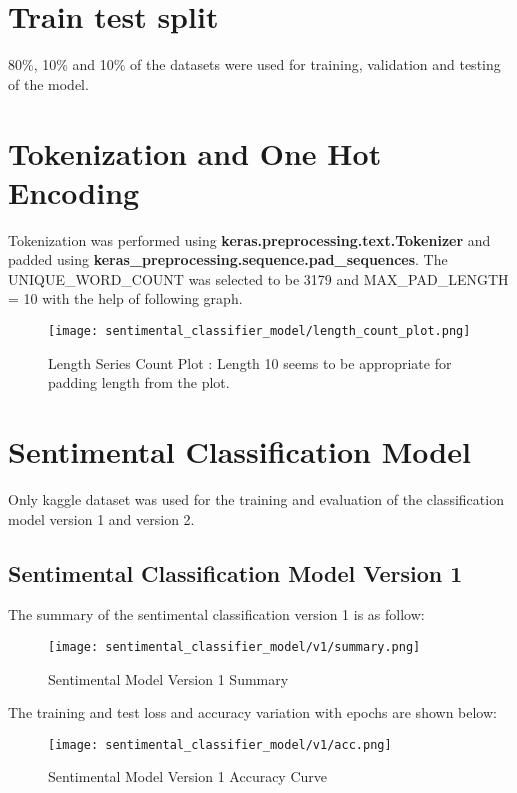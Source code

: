 \section{Train test split}
80\%, 10\% and 10\% of the datasets were used for training, validation and testing of the model.

\section{Tokenization and One Hot Encoding}
Tokenization was performed using \textbf{keras.preprocessing.text.Tokenizer} and padded using \textbf{keras\_preprocessing.sequence.pad\_sequences}. The UNIQUE\_WORD\_COUNT was selected to be 3179 and MAX\_PAD\_LENGTH =  10 with the help of following graph.

\begin{figure}[H]
    \centering
    \texttt{[image: sentimental\_classifier\_model/length\_count\_plot.png]}
    \caption{Length Series Count Plot : Length 10 seems to be appropriate for padding length from the plot.}
    \label{fig:Length Series Count Plot}
\end{figure}

\section{Sentimental Classification Model}
Only kaggle dataset was used for the training and evaluation of the classification model version 1 and version 2. 

\subsection{Sentimental Classification Model Version 1}
The summary of the sentimental classification version 1 is as follow:

\begin{figure}[H]
    \centering
    \texttt{[image: sentimental\_classifier\_model/v1/summary.png]}
    \caption{Sentimental Model Version 1 Summary}
    \label{fig:Sentimental Model Version 1 Summary}
\end{figure}

The training and test loss and accuracy variation with epochs are shown below:

\begin{figure}[H]
    \centering
    \texttt{[image: sentimental\_classifier\_model/v1/acc.png]}
    \caption{Sentimental Model Version 1 Accuracy Curve}
    \label{fig:Sentimental Model Version accuracy curve}
\end{figure}

